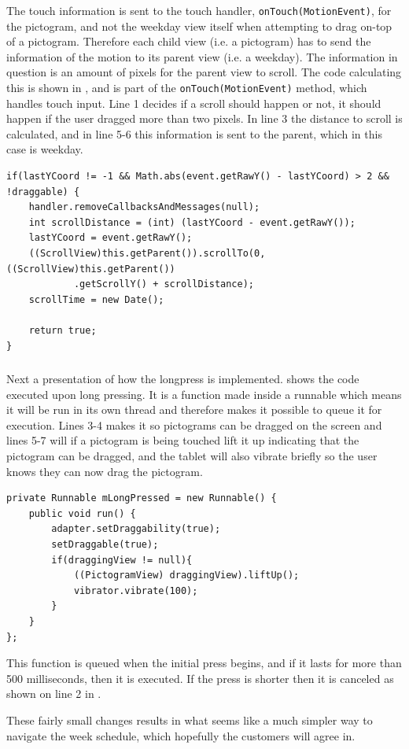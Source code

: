 The touch information is sent to the touch handler, \texttt{onTouch(MotionEvent)}, for the pictogram, and not the weekday view itself when attempting to drag on-top of a pictogram. 
Therefore each child view (i.e. a pictogram) has to send the information of the motion to its parent view (i.e. a weekday). 
The information in question is an amount of pixels for the parent view to scroll. 
The code calculating this is shown in , and is part of the \texttt{onTouch(MotionEvent)} method, which handles touch input. 
Line 1 decides if a scroll should happen or not, it should happen if the user dragged more than two pixels. 
In line 3 the distance to scroll is calculated, and in line 5-6 this information is sent to the parent, which in this case is weekday.  

\begin{lstlisting}[floatplacement=h, caption={The code executed when someone performs a move action.}, label={lst:actionmove}] 
if(lastYCoord != -1 && Math.abs(event.getRawY() - lastYCoord) > 2 && !draggable) {
    handler.removeCallbacksAndMessages(null);
    int scrollDistance = (int) (lastYCoord - event.getRawY());
    lastYCoord = event.getRawY();
    ((ScrollView)this.getParent()).scrollTo(0,((ScrollView)this.getParent())
    		.getScrollY() + scrollDistance);
	scrollTime = new Date();

	return true;
}
\end{lstlisting}

\subsubsection*{}

Next a presentation of how the longpress is implemented.
 shows the code executed upon long pressing.
It is a function made inside a runnable which means it will be run in its own thread and therefore makes it possible to queue it for execution.
Lines 3-4 makes it so pictograms can be dragged on the screen and lines 5-7 will if a pictogram is being touched lift it up indicating that the pictogram can be dragged, and the tablet will also vibrate briefly so the user knows they can now drag the pictogram.

\begin{lstlisting}[floatplacement=h, caption={The longpress function which is queued upon a \texttt{MotionEvent\_Down}, i.e. a touch.}, label={lst:longpress}] 
private Runnable mLongPressed = new Runnable() {
    public void run() {
        adapter.setDraggability(true);
        setDraggable(true);
        if(draggingView != null){
            ((PictogramView) draggingView).liftUp();
            vibrator.vibrate(100);
        }
    }
};
\end{lstlisting}
This function is queued when the initial press begins, and if it lasts for more than 500 milliseconds, then it is executed. 
If the press is shorter then it is canceled as shown on line 2 in . 

These fairly small changes results in what seems like a much simpler way to navigate the week schedule, which hopefully the customers will agree in.